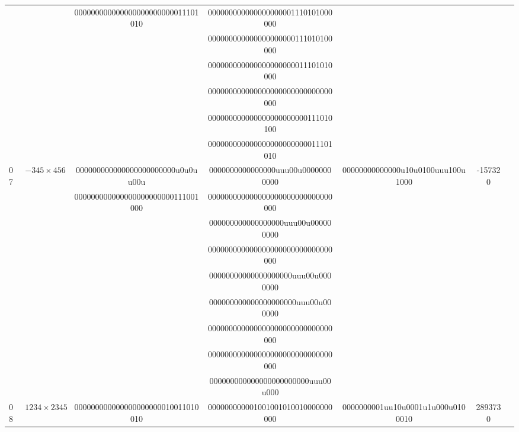 \documentclass[electronics,article,accept,pdftex,moreauthors]{Definitions/mdpi}
\begin{document}
\begin{enumerate}[label={\arabic*).}]
\begin{table}[H]
{\begin{tabular}{lcccccc}
  &            &000000000000000000000000011101010&000000000000000000001110101000000&                                 &\\       
  &            &                                 &000000000000000000000111010100000&                                 &\\  
  &            &                                 &000000000000000000000011101010000&                                 &\\  
  &            &                                 &000000000000000000000000000000000&                                 &\\  
  &            &                                 &000000000000000000000000111010100&                                 &\\  
  &            &                                 &000000000000000000000000011101010&                                 &\\  
07&$-345\times456$&000000000000000000000000u0u0uu00u&0000000000000000uuu00u00000000000&00000000000000u10u0100uuu100u1000&-157320\\
  &            &000000000000000000000000111001000&000000000000000000000000000000000&                                 &\\       
  &            &                                 &000000000000000000uuu00u000000000&                                 &\\  
  &            &                                 &000000000000000000000000000000000&                                 &\\  
  &            &                                 &00000000000000000000uuu00u0000000&                                 &\\  
  &            &                                 &000000000000000000000uuu00u000000&                                 &\\  
  &            &                                 &000000000000000000000000000000000&                                 &\\  
  &            &                                 &000000000000000000000000000000000&                                 &\\  
  &            &                                 &000000000000000000000000uuu00u000&                                 &\\  
08&$1234\times2345$&000000000000000000000010011010010&000000000001001001010010000000000&0000000001uu10u0001u1u000u0100010&2893730\\

\end{tabular}}
\end{table}
\end{enumerate}
\end{document}
